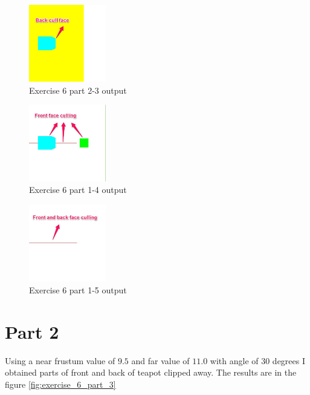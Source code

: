 \begin{figure}[ht!]
	\begin{center}
		\includegraphics[width=0.3\textwidth]{figures/exercise_6_part_2_1}
	\end{center}
	\vspace{-4.5ex}\caption{Exercise 6 part 2-3 output}
	\label{fig:exercise_6_part_2_1} 
\end{figure}
\begin{figure}[ht!]
	\begin{center}
		\includegraphics[width=0.3\textwidth]{figures/exercise_6_part_2_2}
	\end{center}
	\vspace{-4.5ex}\caption{Exercise 6 part 1-4 output}
	\label{fig:exercise_6_part_2_2} 
\end{figure}
\begin{figure}[ht!]
	\begin{center}
		\includegraphics[width=0.3\textwidth]{figures/exercise_6_part_2_3}
	\end{center}
	\vspace{-4.5ex}\caption{Exercise 6 part 1-5 output}
	\label{fig:exercise_6_part_2_3} 
\end{figure}
\clearpage

\section{Part 2}
Using a near frustum value of $9.5$ and far value of $11.0$ with angle of 30 degrees 
I obtained parts of front and back of teapot clipped away. The results are in the figure
\ref{fig:exercise_6_part_3}

